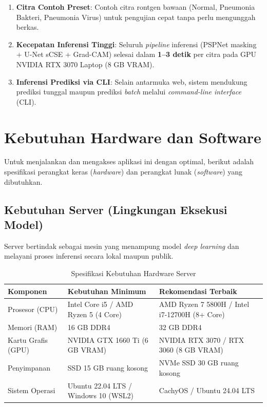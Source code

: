 \documentclass[12pt,a4paper]{article}
\begin{document}
\begin{enumerate}
    \item \textbf{Citra Contoh Preset}: Contoh citra rontgen bawaan (Normal,
    Pneumonia Bakteri, Pneumonia Virus) untuk pengujian cepat tanpa perlu
    mengunggah berkas.

    \item \textbf{Kecepatan Inferensi Tinggi}: Seluruh \textit{pipeline}
    inferensi (PSPNet masking + U-Net sCSE + Grad-CAM) selesai dalam
    \textbf{1--3 detik} per citra pada GPU NVIDIA RTX 3070 Laptop (8 GB VRAM).

    \item \textbf{Inferensi Prediksi via CLI}: Selain antarmuka web, sistem
    mendukung prediksi tunggal maupun prediksi \textit{batch} melalui
    \textit{command-line interface} (CLI).
\end{enumerate}


\section{Kebutuhan Hardware dan Software}

Untuk menjalankan dan mengakses aplikasi ini dengan optimal, berikut adalah
spesifikasi perangkat keras (\textit{hardware}) dan perangkat lunak
(\textit{software}) yang dibutuhkan.

\subsection{Kebutuhan Server (Lingkungan Eksekusi Model)}

Server bertindak sebagai mesin yang menampung model \textit{deep learning} dan
melayani proses inferensi secara lokal maupun publik.

\begin{table}[H]
\centering
\caption{Spesifikasi Kebutuhan Hardware Server}
\begin{tabularx}{\textwidth}{l X X}
\toprule
\textbf{Komponen} & \textbf{Kebutuhan Minimum} & \textbf{Rekomendasi Terbaik} \\
\midrule
Prosesor (CPU)     & Intel Core i5 / AMD Ryzen 5 (4 Core)       & AMD Ryzen 7 5800H / Intel i7-12700H (8+ Core) \\
Memori (RAM)       & 16 GB DDR4                                  & 32 GB DDR4 \\
Kartu Grafis (GPU) & NVIDIA GTX 1660 Ti (6 GB VRAM)              & NVIDIA RTX 3070 / RTX 3060 (8 GB VRAM) \\
Penyimpanan        & SSD 15 GB ruang kosong                      & NVMe SSD 30 GB ruang kosong \\
Sistem Operasi     & Ubuntu 22.04 LTS / Windows 10 (WSL2)        & CachyOS / Ubuntu 24.04 LTS \\
\bottomrule
\end{tabularx}
\end{table}
\end{document}
